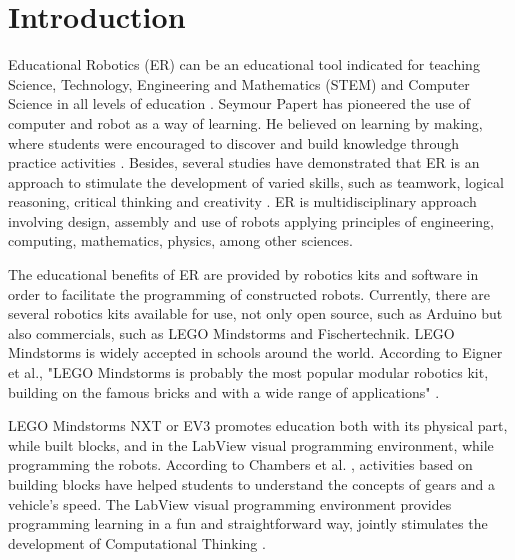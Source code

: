 \documentclass[conference]{IEEEtran}
\begin{document}
%
\IEEEpeerreviewmaketitle



\section{Introduction}

Educational Robotics (ER) can be an educational tool indicated for teaching Science, Technology, Engineering and Mathematics (STEM) and Computer Science in all levels of education \cite{Rogers2}. Seymour Papert has pioneered the use of computer and robot as a way of learning. He believed on learning by making, where students were encouraged to discover and build knowledge through practice activities \cite{PAPERT}. Besides, several studies have demonstrated that ER is an approach to stimulate the development of varied skills, such as teamwork, logical reasoning, critical thinking and creativity \cite{Miller} \cite{Blanchard}. ER is multidisciplinary approach involving design, assembly and use of robots applying principles of engineering, computing, mathematics, physics, among other sciences.

The educational benefits of ER are provided by robotics kits and software in order to facilitate the programming of constructed robots. Currently, there are several robotics kits available for use, not only open source, such as Arduino but also commercials, such as LEGO Mindstorms and Fischertechnik. LEGO Mindstorms is widely accepted in schools around the world. According to Eigner et al., "LEGO Mindstorms is probably the most popular modular robotics kit, building on the famous bricks and with a wide range of applications" \cite{Eigner}. 

LEGO Mindstorms NXT or EV3 promotes education both with its physical part, while built blocks, and in the LabView visual programming environment, while programming the robots. According to Chambers et al. \cite{Chambers}, activities based on building blocks have helped students to understand the concepts of gears and a vehicle’s speed. The LabView visual programming environment provides programming learning in a fun and straightforward way, jointly stimulates the development of Computational Thinking \cite{Bers}.
\end{document}
